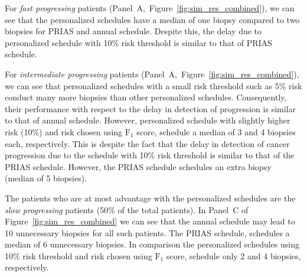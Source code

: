 For \textit{fast progressing} patients (Panel~A,~Figure~\ref{fig:sim_res_combined}), we can see that the personalized schedules have a median of one biopsy compared to two biopsies for PRIAS and annual schedule. Despite this, the delay due to personalized schedule with 10\% risk threshold is similar to that of PRIAS schedule. 

For \textit{intermediate progressing} patients (Panel~A,~Figure~\ref{fig:sim_res_combined}), we can see that personalized schedules with a small risk threshold such as 5\% risk conduct many more biopsies than other personalized schedules. Consequently, their performance with respect to the delay in detection of progression is similar to that of annual schedule. However, personalized schedule with slightly higher risk (10\%) and risk chosen using $\mbox{F}_1$ score, schedule a median of 3 and 4 biopsies each, respectively. This is despite the fact that the delay in detection of cancer progression due to the schedule with 10\% risk threshold is similar to that of the PRIAS schedule. However, the PRIAS schedule schedules an extra biopsy (median of 5 biopsies).

The patients who are at most advantage with the personalized schedules are the \textit{slow progressing} patients (50\% of the total patients). In Panel~C of Figure~\ref{fig:sim_res_combined} we can see that the annual schedule may lead to 10 unnecessary biopsies for all such patients. The PRIAS schedule, schedules a median of 6 unnecessary biopsies. In comparison the personalized schedules using 10\% risk threshold and risk chosen using $\mbox{F}_1$ score, schedule only 2 and 4 biopsies, respectively.

